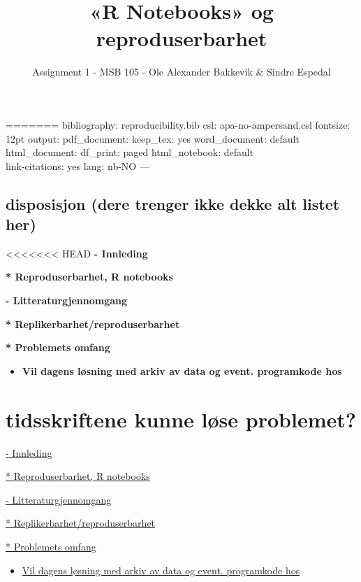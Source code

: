 \documentclass[
  12pt,
  norsk,
]{article}
\title{«R Notebooks» og reproduserbarhet}
\author{Assignment 1 - MSB 105 - Ole Alexander Bakkevik \& Sindre
Espedal}
\date{}
\providecommand{\tightlist}{%
  \setlength{\itemsep}{0pt}\setlength{\parskip}{0pt}}
\begin{document}
\maketitle

======= bibliography: reproducibility.bib csl: apa-no-ampersand.csl
fontsize: 12pt output: pdf\_document: keep\_tex: yes word\_document:
default html\_document: df\_print: paged html\_notebook: default\\
link-citations: yes lang: nb-NO ---

\hypertarget{disposisjon-dere-trenger-ikke-dekke-alt-listet-her}{%
\subsection{disposisjon (dere trenger ikke dekke alt listet
her)}\label{disposisjon-dere-trenger-ikke-dekke-alt-listet-her}}

\textless\textless\textless\textless\textless\textless\textless{} HEAD
\textbf{- Innleding}

\textbf{* Reproduserbarhet, R notebooks}

\textbf{- Litteraturgjennomgang}

\textbf{* Replikerbarhet/reproduserbarhet}

\textbf{* Problemets omfang}

\begin{itemize}
\tightlist
\item
  \textbf{Vil dagens løsning med arkiv av data og event. programkode
  hos}
\end{itemize}

\hypertarget{tidsskriftene-kunne-luxf8se-problemet}{%
\section{\texorpdfstring{\textbf{tidsskriftene kunne løse
problemet?}}{tidsskriftene kunne løse problemet?}}\label{tidsskriftene-kunne-luxf8se-problemet}}

\underline{- Innleding}

\underline{* Reproduserbarhet, R notebooks}

\underline{- Litteraturgjennomgang}

\underline{* Replikerbarhet/reproduserbarhet}

\underline{* Problemets omfang}

\begin{itemize}
\tightlist
\item
  \underline{Vil dagens løsning med arkiv av data og event. programkode
  hos}
\end{itemize}
\end{document}
